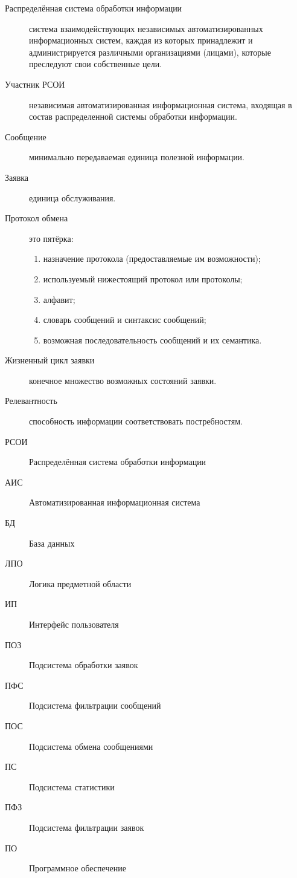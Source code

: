 \documentclass[utf8x, 12pt]{G7-32}
\begin{document}
\frontmatter

\Defines
\begin{description}
        \item[Распределённая система обработки информации] система взаимодействующих
        независимых автоматизированных информационных систем, каждая из которых 
        принадлежит и администрируется различными организациями (лицами), которые 
        преследуют свои собственные цели.
        \item[Участник РСОИ] независимая автоматизированная информационная система,
        входящая в состав распределенной системы обработки информации.  
        \item[Сообщение] минимально передаваемая единица полезной информации.
        \item[Заявка] единица обслуживания.
        \item[Протокол  обмена] это пятёрка:
                \begin{enumerate}
                        \item назначение протокола (предоставляемые им возможности);
                        \item используемый нижестоящий протокол или протоколы;
                        \item алфавит;
                        \item словарь сообщений и синтаксис сообщений;
                        \item возможная последовательность сообщений и их семантика.
                \end{enumerate}
        \item[Жизненный цикл заявки] конечное множество возможных состояний заявки.
        \item[Релевантность] способность информации соответствовать постребностям.
\end{description}

\Abbreviations
\begin{description}
	\item[РСОИ] Распределённая система обработки информации
	\item[АИС] Автоматизированная информационная система
	\item[БД] База данных
	\item[ЛПО] Логика предметной области
	\item[ИП] Интерфейс пользователя
	\item[ПОЗ] Подсистема обработки заявок
	\item[ПФС] Подсистема фильтрации сообщений
	\item[ПОС] Подсистема обмена сообщениями
	\item[ПС] Подсистема статистики
	\item[ПФЗ] Подсистема фильтрации заявок
	\item[ПО] Программное обеспечение
\end{description}
\end{document}
